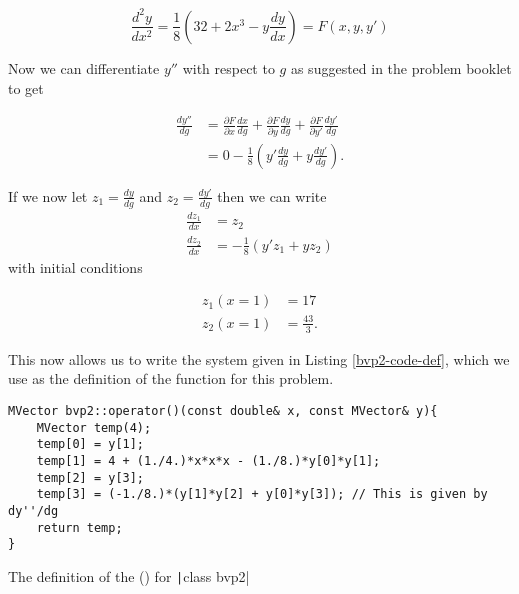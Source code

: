 \documentclass[a4paper,11pt]{report}
\begin{document}
\begin{equation} \label{bvp2-whatever}
	\frac{d^2 y}{dx^2} = \frac{1}{8} \left( 32 + 2 x^3 - y \frac{dy}{dx} \right) = F(x,y,y')
\end{equation}

Now we can differentiate $y''$ with respect to $g$ as suggested in the problem booklet to get

\begin{equation} \label{bvp2-g-diff}
	\begin{aligned}
		\frac{d y''}{dg} &= \frac{\partial F}{\partial x} \frac{dx}{dg} + \frac{\partial F}{\partial y} \frac{dy}{dg} + \frac{\partial F}{\partial y'} \frac{d y'}{dg} \\
		&= 0 - \frac{1}{8} \left(y' \frac{dy}{dg} + y \frac{dy'}{dg} \right) .
	\end{aligned}
\end{equation}

If we now let $z_1 = \frac{dy}{dg}$ and $z_2 = \frac{dy'}{dg}$ then we can write
\begin{equation} \label{bvp2-g-sys}
	\begin{aligned}
	\frac{dz_1}{dx} &= z_2 \\
	\frac{dz_2}{dx} &= - \frac{1}{8} \left(y' z_1 + y z_2\right)
	\end{aligned}
\end{equation}
with initial conditions

\begin{equation} \label{bvp2-g-init}
	\begin{aligned}
	z_1 (x = 1) &= 17 \\
	z_2 (x = 1) &= \frac{43}{3} .
	\end{aligned}
\end{equation}

This now allows us to write the system given in Listing \ref{bvp2-code-def}, which we use as the definition of the function for this problem.

\begin{listing}
\begin{verbatim}
MVector bvp2::operator()(const double& x, const MVector& y){
	MVector temp(4);
	temp[0] = y[1];
	temp[1] = 4 + (1./4.)*x*x*x - (1./8.)*y[0]*y[1];
	temp[2] = y[3];
	temp[3] = (-1./8.)*(y[1]*y[2] + y[0]*y[3]); // This is given by dy''/dg
	return temp;
}
\end{verbatim}
\caption{The definition of the () for \texttt|class bvp2|}
\label{bvp2-code-def}
\end{listing}
\end{document}
